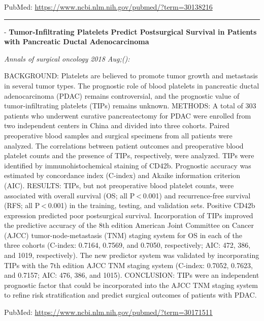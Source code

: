 \documentclass[]{article}
\begin{document}
PubMed: \url{https://www.ncbi.nlm.nih.gov/pubmed/?term=30138216}

{}

{}

\begin{center}\rule{0.5\linewidth}{\linethickness}\end{center}

 - \textbf{Tumor-Infiltrating Platelets Predict Postsurgical Survival in
Patients with Pancreatic Ductal Adenocarcinoma}

\emph{Annals of surgical oncology 2018 Aug;():}

BACKGROUND: Platelets are believed to promote tumor growth and
metastasis in several tumor types. The prognostic role of blood
platelets in pancreatic ductal adenocarcinoma (PDAC) remains
controversial, and the prognostic value of tumor-infiltrating platelets
(TIPs) remains unknown. METHODS: A total of 303 patients who underwent
curative pancreatectomy for PDAC were enrolled from two independent
centers in China and divided into three cohorts. Paired preoperative
blood samples and surgical specimens from all patients were analyzed.
The correlations between patient outcomes and preoperative blood
platelet counts and the presence of TIPs, respectively, were analyzed.
TIPs were identified by immunohistochemical staining of CD42b.
Prognostic accuracy was estimated by concordance index (C-index) and
Akaike information criterion (AIC). RESULTS: TIPs, but not preoperative
blood platelet counts, were associated with overall survival (OS; all
P \textless{} 0.001) and recurrence-free survival (RFS; all
P \textless{} 0.001) in the training, testing, and validation sets.
Positive CD42b expression predicted poor postsurgical survival.
Incorporation of TIPs improved the predictive accuracy of the 8th
edition American Joint Committee on Cancer (AJCC) tumor-node-metastasis
(TNM) staging system for OS in each of the three cohorts (C-index:
0.7164, 0.7569, and 0.7050, respectively; AIC: 472, 386, and 1019,
respectively). The new predictor system was validated by incorporating
TIPs with the 7th edition AJCC TNM staging system (C-index: 0.7052,
0.7623, and 0.7157; AIC: 476, 386, and 1015). CONCLUSION: TIPs were an
independent prognostic factor that could be incorporated into the AJCC
TNM staging system to refine risk stratification and predict surgical
outcomes of patients with PDAC.

PubMed: \url{https://www.ncbi.nlm.nih.gov/pubmed/?term=30171511}

{}
\end{document}
